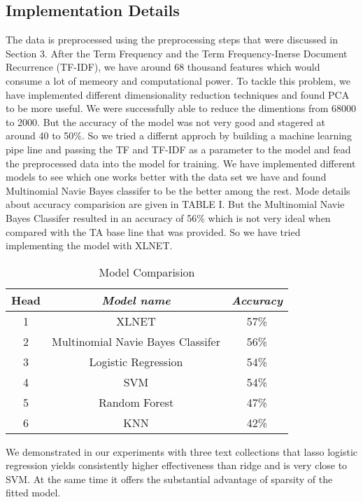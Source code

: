 \documentclass[conference]{IEEEtran}
\begin{document}
\subsection{Implementation Details}
The data is preprocessed using the preprocessing steps that were discussed in Section 3. After the Term Frequency and the Term Frequency-Inerse Document Recurrence (TF-IDF), we have around 68 thousand features which would consume a lot of memeory and computational power.
To tackle this problem, we have implemented different dimensionality reduction techniques and found PCA to be more useful. We were successfully able to reduce the dimentions from 68000 to 2000. But the accuracy of the model was not very good and stagered at around 40 to 50\%.
So we tried a differnt approch by building a machine learning pipe line and passing the TF and TF-IDF as a parameter to the model and fead the preprocessed data into the model for training. We have implemented different models to see which one works better with the data set we have and found Multinomial Navie Bayes classifer to be the better among the rest. Mode details about accuracy comparision are given in TABLE I. 
But the Multinomial Navie Bayes Classifer resulted in an accuracy of 56\% which is not very ideal when compared with the TA base line that was provided. So we have tried implementing the model with XLNET.
\begin{table}[htbp]
	\caption{Model Comparision}
	\begin{center}
	\begin{tabular}{|c|c|c|}
	\hline
	\cline{2-3} 
	\textbf{Head} & \textbf{\textit{Model name}}& \textbf{\textit{Accuracy}}\\
	\hline
	1& XLNET&57\%\\
	\hline
	2& Multinomial Navie Bayes Classifer&56\% \\
	\hline
	3& Logistic Regression& 54\%\\
	\hline
	4& SVM&54\% \\
	\hline
	5& Random Forest&47\% \\
	\hline
	6& KNN&42\% \\
	\hline
	\end{tabular}
	\label{tab1}
	\end{center}
	\end{table}
	
We demonstrated in our experiments with three text collections that lasso logistic regression yields consistently higher
effectiveness than ridge and is very close to SVM. At the
same time it offers the substantial advantage of sparsity of
the fitted model.
\end{document}
